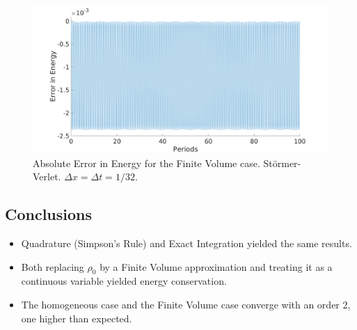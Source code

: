 \documentclass{article}
\begin{document}
\begin{figure}
\centering
\includegraphics[width=\textwidth]{32Method4.png}
\caption{Absolute Error in Energy for the Finite Volume case. St\"{o}rmer-Verlet. $\Delta x = \Delta t = 1/32$.} 
\label{fig:abserrcon}
\end{figure}

\subsection{Conclusions}
\begin{itemize}
\item Quadrature (Simpson's Rule) and Exact Integration yielded the same results. 
\item Both replacing $\rho_0$ by a Finite Volume approximation and treating it as a continuous variable yielded energy conservation.
\item The homogeneous case and the Finite Volume case converge with an order 2, one higher than expected.
\end{itemize}







\end{document}
